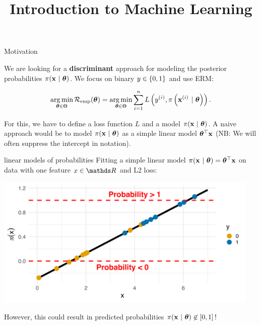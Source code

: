 \documentclass[11pt,compress,t,notes=noshow, xcolor=table]{beamer}
\title{Introduction to Machine Learning}
\begin{document}

\framebreak


\begin{vbframe}{Motivation}

We are looking for a \textbf{discriminant} approach for modeling the posterior probabilities $\pi(\mathbf{x}~|~ \bm{\theta})$. %
We focus on binary $y \in \{0, 1\}$ and use ERM:
  
$$ \operatorname*{arg\,min}_{\bm{\theta} \in \Theta} \mathcal{R}_{\text{emp}}(\bm{\theta}) = \operatorname*{arg\,min}_{\bm{\theta} \in \Theta} \sum\limits_{i=1}^n L\left(y^{(i)}, \pi\left(\mathbf{x}^{(i)} ~|~ \bm{\theta}\right)\right).$$

\lz
For this, we have to define a loss function $L$ and a model $\pi(\mathbf{x}~|~ \bm{\theta})$.
A naive approach would be to model $\pi(\mathbf{x}~|~ \bm{\theta})$ as a simple linear model $\bm{\theta}^\top \mathbf{x}$ 
(NB: We will often suppress the intercept in notation).

\end{vbframe}

\begin{vbframe}{linear models of probabilities}
Fitting a simple linear model $\pi(\mathbf{x}~|~ \bm{\theta}) = \bm{\theta}^\top \mathbf{x}$ on data with one feature $x \in \R$ and L2 loss:

\lz 

{\centering \includegraphics[width=0.95\textwidth]{figure/preds_with_probs-linear.png}
}

However, this could result in predicted probabilities $\pi(\mathbf{x}~|~ \bm{\theta}) \not\in [0,1]$!

\end{vbframe}
\end{document}
